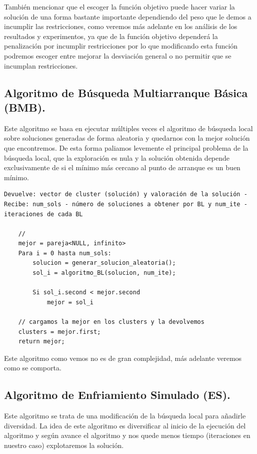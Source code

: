 \documentclass[12pt, spanish]{article}
\begin{document}
También mencionar que el escoger la función objetivo puede hacer variar la solución de una forma bastante importante dependiendo del peso que le demos a incumplir las restricciones, como veremos más adelante en los análisis de los resultados y experimentos, ya que de la función objetivo dependerá la penalización por incumplir restricciones por lo que modificando esta función podremos escoger entre mejorar la desviación general o no permitir que se incumplan restricciones.


\subsection{Algoritmo de Búsqueda Multiarranque Básica (BMB).}

Este algoritmo se basa en ejecutar múltiples veces el algoritmo de búsqueda local sobre soluciones generadas de forma aleatoria y quedarnos con la mejor solución que encontremos. De esta forma paliamos levemente el principal problema de la búsqueda local, que la exploración es nula y la solución obtenida depende exclusivamente de si el mínimo más cercano al punto de arranque es un buen mínimo. 

\begin{lstlisting}
Devuelve: vector de cluster (solución) y valoración de la solución - Recibe: num_sols - número de soluciones a obtener por BL y num_ite - iteraciones de cada BL

	//
	mejor = pareja<NULL, infinito>
	Para i = 0 hasta num_sols:
		solucion = generar_solucion_aleatoria();
		sol_i = algoritmo_BL(solucion, num_ite);
		
		Si sol_i.second < mejor.second
			mejor = sol_i
		
	// cargamos la mejor en los clusters y la devolvemos
	clusters = mejor.first;		
	return mejor; 

\end{lstlisting} 

Este algoritmo como vemos no es de gran complejidad, más adelante veremos como se comporta.

\subsection{Algoritmo de Enfriamiento Simulado (ES).}

Este algoritmo se trata de una modificación de la búsqueda local para añadirle diversidad. La idea de este algoritmo es diversificar al inicio de la ejecución del algoritmo y según avance el algoritmo y nos quede menos tiempo (iteraciones en nuestro caso) explotaremos la solución.
\end{document}
